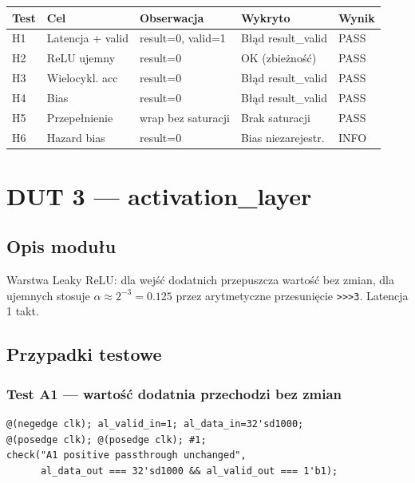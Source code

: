 \documentclass[12pt,a4paper]{article}
\begin{document}
\begin{center}
\begin{tabular}{lllll}
\toprule
\textbf{Test} & \textbf{Cel} & \textbf{Obserwacja} & \textbf{Wykryto} & \textbf{Wynik} \\
\midrule
H1 & Latencja + valid & result=0, valid=1 & Błąd result\_valid & PASS \\
H2 & ReLU ujemny & result=0 & OK (zbieżność) & PASS \\
H3 & Wielocykl. acc & result=0 & Błąd result\_valid & PASS \\
H4 & Bias & result=0 & Błąd result\_valid & PASS \\
H5 & Przepełnienie & wrap bez saturacji & Brak saturacji & PASS \\
H6 & Hazard bias & result=0 & Bias niezarejestr. & INFO \\
\bottomrule
\end{tabular}
\end{center}

\section{DUT 3 — activation\_layer}

\subsection{Opis modułu}

Warstwa Leaky ReLU: dla wejść dodatnich przepuszcza wartość bez zmian, dla ujemnych stosuje $\alpha \approx 2^{-3} = 0.125$ przez arytmetyczne przesunięcie \texttt{>>>3}. Latencja 1 takt.

\subsection{Przypadki testowe}

\subsubsection*{Test A1 — wartość dodatnia przechodzi bez zmian}

\begin{lstlisting}
@(negedge clk); al_valid_in=1; al_data_in=32'sd1000;
@(posedge clk); @(posedge clk); #1;
check("A1 positive passthrough unchanged",
      al_data_out === 32'sd1000 && al_valid_out === 1'b1);
\end{lstlisting}
\end{document}
